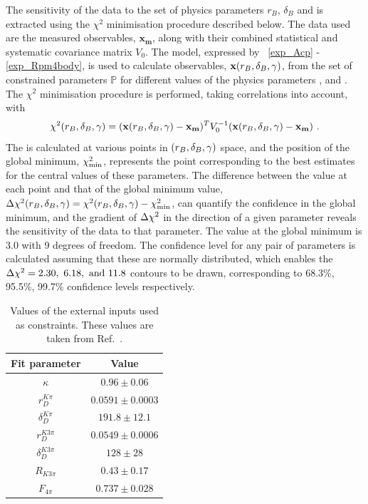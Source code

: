 The sensitivity of the data to the set of physics parameters $r_B$, $\delta_B$ and \Pgamma is extracted using the $\chi^2$ minimisation procedure described below. The data used are the measured \CP observables, $\mathbf{x_m}$, along with their combined statistical and systematic covariance matrix $V_0$. The model, expressed by \eqns~\ref{exp_Acp} - \ref{exp_Rpm4body}, is used to calculate \CP observables, $\mathbf{x}(r_B, \delta_B, \gamma)$, from the set of constrained parameters $\mathbb{P}$ for different values of the physics parameters \rb, \deltab and \Pgamma. The $\chi^2$ minimisation procedure is performed, taking correlations into account, with
\begin{equation}
\chi^2(r_B, \delta_B, \gamma) = (\mathbf{x}(r_B, \delta_B, \gamma) - \mathbf{x_m})^TV_0^{-1}(\mathbf{x}(r_B, \delta_B, \gamma) - \mathbf{x_m}) \text{ .}
\end{equation}
The \chisq is calculated at various points in $\left(r_B, \delta_B, \gamma\right)$ space, and the position of the global minimum, $\chi^2_{\text{min}}$, represents the point corresponding to the best estimates for the central values of these parameters. The difference between the \chisq value at each point and that of the global minimum value, $\Delta\chi^2(r_B, \delta_B, \gamma) = \chi^2(r_B, \delta_B, \gamma) - \chi^2_{\text{min}}$, can quantify the confidence in the global minimum, and the gradient of $\Delta\chi^2$ in the direction of a given parameter reveals the sensitivity of the data to that parameter. The \chisq value at the global minimum is 3.0 with 9 degrees of freedom. The confidence level for any pair of parameters is calculated assuming that these are normally distributed, which enables the $\Delta\chi^2 = 2.30,\ 6.18,\ \text{and } 11.8$ contours to be drawn, corresponding to 68.3\%, 95.5\%,  99.7\% confidence levels respectively.

\begin{table}
\centering
\begin{tabular}{cc}
Fit parameter & Value \\
\hline
$\kappa$ & $0.96 \pm 0.06$ \\
$r_D^{K\pi}$ & $0.0591 \pm 0.0003$ \\
$\delta_D^{K\pi}$ & $191.8 \pm 12.1$ \\
$r_D^{K3\pi}$ & $0.0549 \pm 0.0006$ \\
$\delta_D^{K3\pi}$ & $128 \pm 28$ \\
$R_{K3\pi}$ & $0.43 \pm 0.17$ \\
$F_{4\pi}$ & $0.737 \pm 0.028$
\end{tabular}
\caption{Values of the external inputs used as constraints. These values are taken from Ref.~\cite{HFAG,charmk3pi,charmk3pi_errata,charm4pi}.}
\label{inputparameters}
\end{table}

